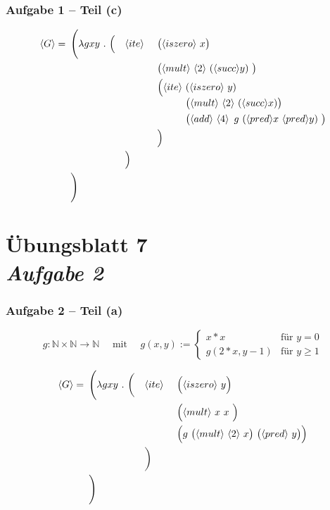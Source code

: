 \documentclass{beamer}
\newcommand{\num}[1]{\ensuremath{\langle #1 \rangle}}
\begin{document}
\begin{frame} \frametitle{Aufgabe 1 -- Teil (c)}
	\small
	\begin{alignat*}{3}
		\num{G} = \enskip & \Biggl( \lambda g xy \ . \ \Bigl( &&\num{ite} \ && \bigl( \num{iszero} \ x \bigr) \\
		&&&&& \bigl( \num{mult} \ \num{2} \ (\num{succ} y) \ \bigr) \\
		&&&&& \Bigl( 
			\begin{alignedat}[t]{1}
			\num{ite} \ &(\num{iszero} \ y) \\
			& \bigl( \num{mult} \ \num{2} \ (\num{succ} x) \bigr) \\
			& \bigl( \num{add} \ \num{4} \enskip g \ (\num{pred} x \ \num{pred} y)  \ \bigr) \\				
		\end{alignedat} \\
		&&&&& \Bigr) \\
		&&& \Bigr) \\
		& \Biggr)
	\end{alignat*}
\end{frame}


\section{Übungsblatt 7 \\ \textit{\normalsize Aufgabe 2}}

\begin{frame} \frametitle{Aufgabe 2 -- Teil (a)}
	\small
	\begin{equation*}
		g \colon \mathbb{N} \times \mathbb{N} \to \mathbb{N} \quad \text{ mit } \quad g(x,y) := \begin{cases}
		x * x & \text{für } y=0 \\
		g(2*x,y-1) & \text{für } y \ge 1 
		\end{cases}
	\end{equation*}
	
	\medskip
	
	\begin{alignat*}{3}
		\num{G} = \enskip & \Biggl( \lambda g xy \ . \ \biggl( &&\num{ite} \ && \Bigl( \num{iszero} \ y \Bigr) \\
		&&&&& \Bigl( \num{mult} \ x \ x \ \Bigr) \\
		&&&&& \Bigl( g \ \bigl( \num{mult} \ \num{2} \ x \bigr) \ \bigl( \num{pred} \ y \bigr) \Bigr) \\
		&&& \biggr) \\
		& \Biggr)
	\end{alignat*}
\end{frame}
\end{document}
